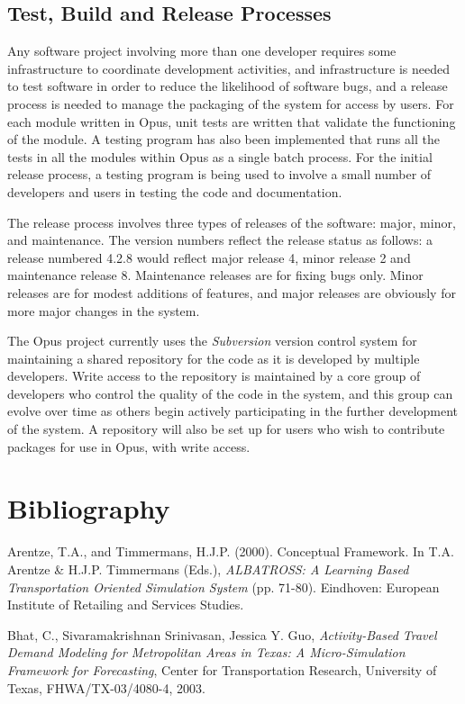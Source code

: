 \subsection{Test, Build and Release Processes}
Any software project involving more than one developer requires some infrastructure to coordinate development activities, and infrastructure is needed to test software in order to reduce the likelihood of software bugs, and a release process is needed to manage the packaging of the system for access by users.  For each module written in Opus, unit tests are written that validate the functioning of the module. A testing program has also been implemented that runs all the tests in all the modules within Opus as a single batch process.  
For the initial release process, a testing program is being used to involve a small number of developers and users in testing the code and documentation.  

The release process involves three types of releases of the software: major, minor, and maintenance. The version numbers reflect the release status as follows: a release numbered 4.2.8 would reflect major release 4, minor release 2 and maintenance release 8.  Maintenance releases are for fixing bugs only.  Minor releases are for modest additions of features, and major releases are obviously for more major changes in the system.

The Opus project currently uses the \emph{Subversion} version control system for maintaining a shared repository for the code as it is developed by multiple developers. Write access to the repository is maintained by a core group of developers who control the quality of the code in the system, and this group can evolve over time as others begin actively participating in the further development of the system. A repository will also be set up for users who wish to contribute packages for use in Opus, with write access.


\newpage
\section{Bibliography}

Arentze, T.A., and Timmermans, H.J.P. (2000). Conceptual Framework. In T.A. Arentze \& H.J.P. Timmermans (Eds.), \emph{ALBATROSS: A Learning Based Transportation Oriented Simulation System} (pp. 71-80). Eindhoven: European Institute of Retailing and Services Studies.

Bhat, C., Sivaramakrishnan Srinivasan, Jessica Y. Guo, \emph{Activity-Based Travel Demand Modeling for Metropolitan Areas in Texas: A Micro-Simulation Framework for Forecasting}, Center for Transportation Research, University of Texas, FHWA/TX-03/4080-4, 2003.


